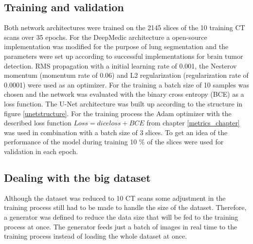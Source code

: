 \subsection{Training and validation}
Both network architectures were trained on the 2145 slices of the 10 training CT scans over 35 epochs.\newline
For the DeepMedic architecture a open-source implementation \cite{deepmedic} was modified for the purpose of lung segmentation and the parameters were set up according to successful implementations for brain tumor detection. RMS propagation with a initial learning rate of 0.001, the Nesterov momentum (momentum rate of 0.06) and L2 regularization (regularization rate of 0.0001) were used as an optimizer. For the training a batch size of 10 samples was chosen and the network was evaluated with the binary cross entropy (BCE) as a loss function.\newline
The U-Net architecture was built up according to the structure in figure \ref{unetstructure}. For the training process the Adam optimizer with the described loss function $Loss = dice loss + BCE$ from chapter \ref{metrics_chapter} was used in combination with a batch size of 3 slices. To get an idea of the performance of the model during training 10 \% of the slices were used for validation in each epoch.\newline

\subsection{Dealing with the big dataset}
Although the dataset was reduced to 10 CT scans some adjustment in the training process still had to be made to handle the size of the dataset.\newline
Therefore, a generator was defined to reduce the data size that will be fed to the training process at once. The generator feeds just a batch of images in real time to the training process instead of loading the whole dataset at once.